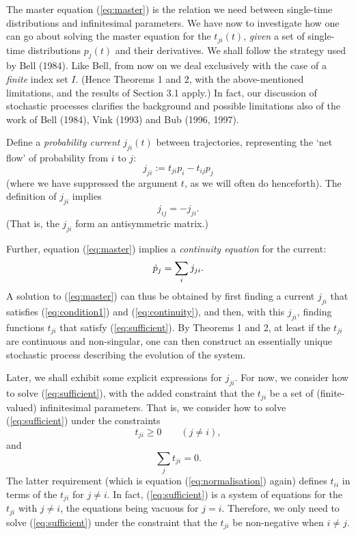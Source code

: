\documentclass[12pt]{article}
\newcommand{\be}{\vspace*{6pt} \begin{equation}}
\newcommand{\ee}{\vspace*{10pt} \end{equation}}
\begin{document}
The master equation (\ref{eq:master}) is the relation we need between
single-time distributions and infinitesimal parameters.  We have now
to investigate how one can go about solving the master equation for
the $t_{ji}(t)$, {\em given} a set of single-time distributions
$p_j(t)$ and their derivatives.  We shall follow the strategy used by
Bell (1984).  Like Bell, from now on we deal exclusively with the case
of a {\em finite} index set $I$.  (Hence Theorems 1 and 2, with the
above-mentioned limitations, and the results
of Section 3.1 apply.) In fact, our discussion of stochastic processes
clarifies the background and possible limitations also of the work of
Bell (1984), Vink (1993) and Bub (1996, 1997).

Define a {\em probability current} $j_{ji}(t)$ between trajectories,
representing the `net flow' of probability from $i$ to $j$:
  \begin{equation}
    \label{eq:sufficient}
    j_{ji}:= t_{ji}p_i - t_{ij}p_j
  \end{equation}
(where we have suppressed the argument $t$, as we will often do
henceforth).
The definition of $j_{ji}$ implies
  \begin{equation}
    j_{ij} = -j_{ji}.
    \label{eq:condition1}
  \end{equation}
\noindent (That is, the $j_{ji}$ form an antisymmetric matrix.)

Further, equation (\ref{eq:master}) implies a {\em continuity equation}
for the current:
\be
\label{eq:continuity}
\dot{p}_j = \sum_i j_{ji}.
\ee
A solution to (\ref{eq:master}) can thus be obtained by first finding
a current $j_{ji}$ that satisfies (\ref{eq:condition1}) and
(\ref{eq:continuity}), and then, with this $j_{ji}$, finding functions
$t_{ji}$ that satisfy (\ref{eq:sufficient}).  By Theorems 1 and 2, at
least if the $t_{ji}$ are continuous and non-singular,
one can then construct an essentially unique stochastic process
describing the evolution of the system.

Later, we shall exhibit some explicit expressions for $j_{ji}$.  For
now, we consider how to solve (\ref{eq:sufficient}), with the added
constraint that the $t_{ji}$ be a set of (finite-valued) infinitesimal
parameters. That is, we consider how to solve (\ref{eq:sufficient}) under
the constraints
  \begin{equation}
    t_{ji}\geq 0 \qquad(j\neq i),  \label{eq:blah1}
  \end{equation}
and
  \begin{equation}
    \sum_j t_{ji}=0.    \label{eq:blah2}
  \end{equation}
The latter requirement (which is equation (\ref{eq:normalisation})
again) defines $t_{ii}$ in terms of the $t_{ji}$ for $j\neq i$.  In
fact, (\ref{eq:sufficient}) is a system of equations for the $t_{ji}$
with $j\neq i$, the equations being vacuous for $j=i$.  Therefore, we
only need to solve (\ref{eq:sufficient}) under the constraint that the
$t_{ji}$ be non-negative when $i \neq j$.
\end{document}
